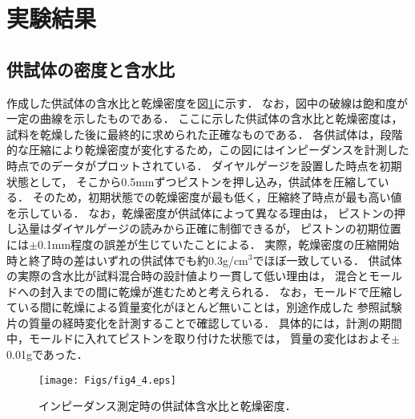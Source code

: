 \section{実験結果}
\subsection{供試体の密度と含水比}
作成した供試体の含水比と乾燥密度を図\ref{fig:fig4_4}に示す．
なお，図中の破線は飽和度が一定の曲線を示したものである．
ここに示した供試体の含水比と乾燥密度は，試料を乾燥した後に最終的に求められた正確なものである．
各供試体は，段階的な圧縮により乾燥密度が変化するため，この図にはインピーダンスを計測した
時点でのデータがプロットされている．
ダイヤルゲージを設置した時点を初期状態として，
そこから0.5mmずつピストンを押し込み，供試体を圧縮している．
そのため，初期状態での乾燥密度が最も低く，圧縮終了時点が最も高い値を示している．
なお，乾燥密度が供試体によって異なる理由は，
ピストンの押し込量はダイヤルゲージの読みから正確に制御できるが，
ピストンの初期位置には$\pm$0.1mm程度の誤差が生じていたことによる．
実際，乾燥密度の圧縮開始時と終了時の差はいずれの供試体でも約0.3g/cm$^3$でほぼ一致している．
供試体の実際の含水比が試料混合時の設計値より一貫して低い理由は，
混合とモールドへの封入までの間に乾燥が進むためと考えられる．
なお，モールドで圧縮している間に乾燥による質量変化がほとんど無いことは，別途作成した
参照試験片の質量の経時変化を計測することで確認している．
具体的には，計測の期間中，モールドに入れてピストンを取り付けた状態では，
質量の変化はおよそ$\pm$0.01gであった．
\begin{figure}[h]
	\begin{center}
	\texttt{[image: Figs/fig4\_4.eps]} 
	\end{center}
	\caption{
		インピーダンス測定時の供試体含水比と乾燥密度．
	} 
	\label{fig:fig4_4}
\end{figure}
